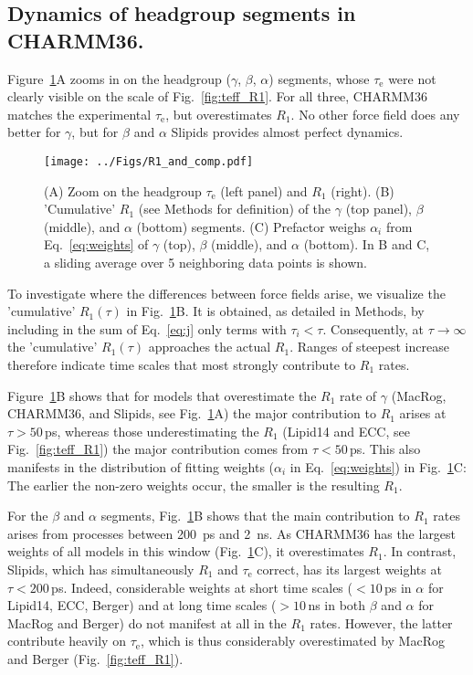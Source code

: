 \documentclass[journal=jpcbfk,manuscript=article,layout=twocolumn]{achemso}
\begin{document}
\subsection*{Dynamics of headgroup segments in CHARMM36.}

Figure~\ref{fig:cumulativeR1s}A zooms in on the headgroup ($\gamma$, $\beta$, $\alpha$) segments,
whose $\tau_\mathrm e$ were not clearly visible on the scale of Fig.~\ref{fig:teff_R1}.
%
For all three, CHARMM36 matches the experimental $\tau_\mathrm e$,
but overestimates $R_1$.
%
No other force field does any better for $\gamma$, but
for $\beta$ and $\alpha$ Slipids provides almost perfect dynamics.

\begin{figure}[!h]
\centering
\texttt{[image: ../Figs/R1\_and\_comp.pdf]}
\caption{
(A) Zoom on the headgroup $\tau_\mathrm e$ (left panel) and $R_1$ (right).
(B) 'Cumulative' $R_1$ (see Methods for definition) of the
$\gamma$ (top panel), $\beta$ (middle), and $\alpha$ (bottom) segments.
(C) Prefactor weighs $\alpha_i$ from Eq.~\eqref{eq:weights} of $\gamma$ (top), $\beta$ (middle), and $\alpha$ (bottom).
In B and C, a sliding average over 5 neighboring data points is shown.
}
\label{fig:cumulativeR1s}
\end{figure}

To investigate where the differences between force fields arise, we visualize the 
'cumulative' $R_1(\tau)$ in Fig.~\ref{fig:cumulativeR1s}B.
It is obtained, as detailed in Methods,
by including in the sum of Eq.~\eqref{eq:j} only terms with $\tau_i<\tau$.
Consequently, at $\tau\to\infty$ the 'cumulative' $R_1(\tau)$ approaches the actual $R_1$. Ranges of steepest increase therefore indicate time scales that most strongly contribute to $R_1$ rates.

Figure~\ref{fig:cumulativeR1s}B shows
that for models that overestimate the $R_1$ rate of $\gamma$
(MacRog, CHARMM36, and Slipids, see Fig.~\ref{fig:cumulativeR1s}A)
the major contribution to $R_1$ arises at $\tau>50$\,ps, whereas those underestimating the $R_1$ 
(Lipid14 and ECC, see Fig.~\ref{fig:teff_R1})
the major contribution comes from $\tau<50$\,ps. 
%
This also manifests in the
distribution of fitting weights ($\alpha_i$ in Eq.~\eqref{eq:weights}) in Fig.~\ref{fig:cumulativeR1s}C:
The earlier the non-zero weights occur, the smaller is the resulting $R_1$.


For the $\beta$ and $\alpha$ segments, Fig.~\ref{fig:cumulativeR1s}B shows
that the main contribution to $R_1$ rates arises from processes
between 200~ps and 2~ns.
%
As CHARMM36 has the largest weights of all models in this window (Fig.~\ref{fig:cumulativeR1s}C),
it overestimates $R_1$.
%
In contrast, Slipids, which has simultaneously $R_1$ and $\tau_\mathrm e$ correct,
has its largest weights at $\tau<200$\,ps.
%
Indeed, considerable weights
at short time scales ($<10$\,ps in $\alpha$ for Lipid14, ECC, Berger) and
at long time scales ($>10$\,ns in both $\beta$ and $\alpha$ for MacRog and Berger)
do not manifest at all in the $R_1$ rates.
%
However, the latter contribute heavily on $\tau_\mathrm e$,
which is thus considerably overestimated by MacRog and Berger (Fig.~\ref{fig:teff_R1}).
\end{document}
